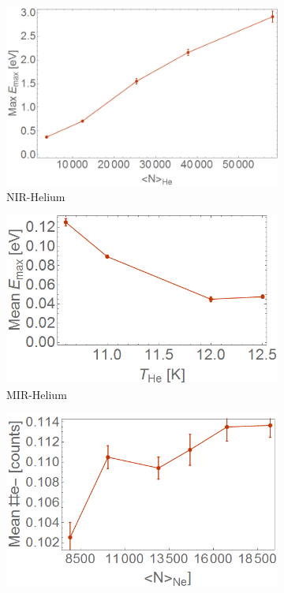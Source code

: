 \begin{figure}[h!]
\begin{subfigure}[l]{0.32\textwidth}
\includegraphics[width=1\textwidth]{../Images/results/NI_He_Dropletsize/MeanEnerg.png} 
\caption{NIR-Helium }\end{subfigure}
\begin{subfigure}[l]{0.32\textwidth}
\includegraphics[width=1\textwidth]{../Images/results/Mir_He_Dropletsize/MeanEnerg.png} 
\caption{MIR-Helium }\end{subfigure}
\begin{subfigure}[l]{0.32\textwidth}
\includegraphics[width=1\textwidth]{../Images/results/MIR_Ne_DropletSize/MeanEnerg.png} 

\end{subfigure}
\end{figure}
